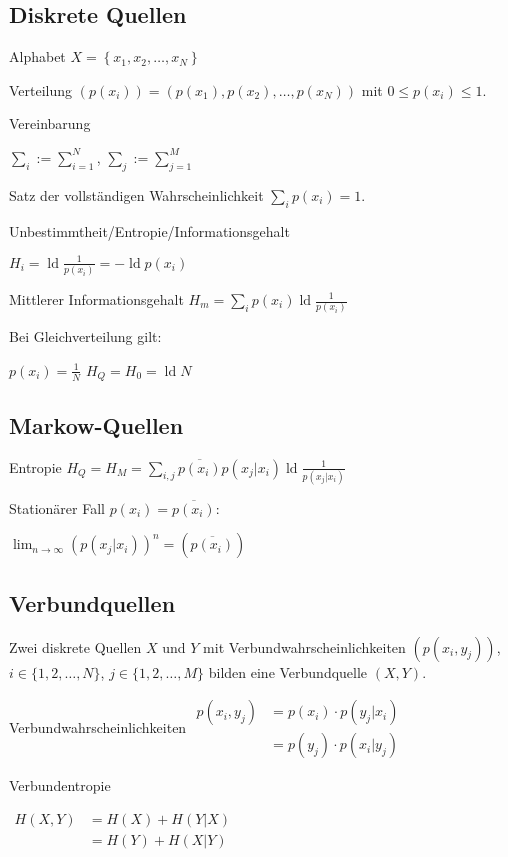 \documentclass[8pt,a4paper,landscape]{extarticle}
\DeclareMathOperator*{\ld}{ld}
\begin{document}
\begin{multicols*}{6}
\RaggedRight
\section{Diskrete Quellen}
Alphabet $X = \left\lbrace x_1, x_2, \dots , x_N\right\rbrace$

Verteilung $(p(x_i)) = (p(x_1), p(x_2), \dots, p(x_N))$ mit $0 \leq p(x_i) \leq 1$.

Vereinbarung

$\displaystyle \sum_i := \sum_{i=1}^N$, $\displaystyle \sum_j := \sum_{j=1}^M$

Satz der vollständigen Wahr\-schein\-lich\-keit $\sum_i p(x_i) = 1$.

Unbestimmtheit/Ent\-ropie/Infor\-ma\-tions\-ge\-halt

$\boxed{H_i = \ld \frac{1}{p(x_i)}} = -\ld p(x_i)$

Mittlerer Informationsgehalt $\boxed{H_m = \sum_i p(x_i) \ld \frac{1}{p(x_i)}}$

Bei Gleichverteilung gilt:

$p(x_i) = \frac{1}{N}$ $H_Q = H_0 = \ld N$

\subsection{Markow-Quellen}
Entropie $H_Q = H_M = \boxed{\sum_{i,j} \overline{p(x_i)} p(x_j | x_i) \ld \frac{1}{p(x_j | x_i)}}$

Stationärer Fall $p(x_i) = \overline{p(x_i)}$:

$\lim_{n \rightarrow \infty} (p(x_j | x_i))^n  = (\overline{p(x_i)})$

\subsection{Verbundquellen}
Zwei diskrete Quellen $X$ und $Y$ mit Verbundwahrscheinlichkeiten $(p(x_i, y_j))$, $i \in \lbrace1, 2, \dots, N\rbrace$, $j \in \lbrace1, 2, \dots, M\rbrace$ bilden eine Verbundquelle $(X, Y)$.

Verbundwahrscheinlichkeiten
$\boxed{\begin{aligned}
	p(x_i, y_j)	&= p(x_i) \cdot p(y_j|x_i) \\
			&= p(y_j) \cdot p(x_i|y_j)
\end{aligned}}$

Verbundentropie

$\begin{aligned}
	H(X, Y)	&= H(X) + H(Y|X) \\
		&= H(Y) + H(X|Y)
\end{aligned}$


\end{multicols*}
\end{document}
